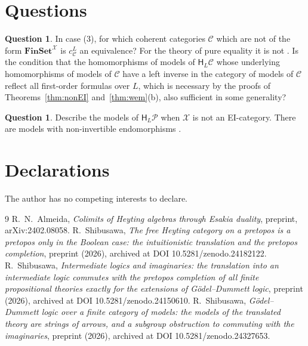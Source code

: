 \documentclass[11pt]{amsart}
\theoremstyle{definition}
\newtheorem{que}[thm]{Question}
\newcommand{\Fin}{\mathbf{FinSet}}
\newcommand{\HH}{\mathsf H}
\newcommand{\cX}{\mathcal X}
\newcommand{\cC}{\mathcal C}
\newcommand{\cP}{\mathcal P}
\begin{document}
\section{Questions}

\begin{que}
In case (3), for which coherent categories $\cC$ which are not of the
form $\Fin^{\cX}$ is $c^L_\cC$ an equivalence? For the theory of pure
equality it is not \cite[Thm.~7.2]{Interm}. Is the condition that the
homomorphisms of models of $\HH_L\cC$ whose underlying homomorphisms
of models of $\cC$ have a left inverse in the category of models of
$\cC$ reflect all first-order formulas over $L$, which
is necessary by the proofs of Theorems~\ref{thm:nonEI}
and~\ref{thm:wem}(b), also sufficient in some generality?
\end{que}

\begin{que}
Describe the models of $\HH_L\cP$ when $\cX$ is not an EI-category.
There are models with non-invertible endomorphisms
\cite[Ex.~7.2]{Strings}.
\end{que}

\section*{Declarations}
The author has no competing interests to declare.

\begin{thebibliography}{9}
 R.~N.~Almeida, \emph{Colimits of Heyting algebras
through Esakia duality}, preprint, arXiv:2402.08058.
 R.~Shibusawa, \emph{The free Heyting category on a
pretopos is a pretopos only in the Boolean case: the intuitionistic
translation and the pretopos completion}, preprint (2026), archived at
DOI 10.5281/zenodo.24182122.
 R.~Shibusawa, \emph{Intermediate logics and
imaginaries: the translation into an intermediate logic commutes with
the pretopos completion of all finite propositional theories exactly
for the extensions of G\"odel--Dummett logic}, preprint (2026),
archived at DOI 10.5281/zenodo.24150610.
 R.~Shibusawa, \emph{G\"odel--Dummett logic over a
finite category of models: the models of the translated theory are
strings of arrows, and a subgroup obstruction to commuting with the
imaginaries}, preprint (2026), archived at DOI
10.5281/zenodo.24327653.
\end{thebibliography}
\end{document}
